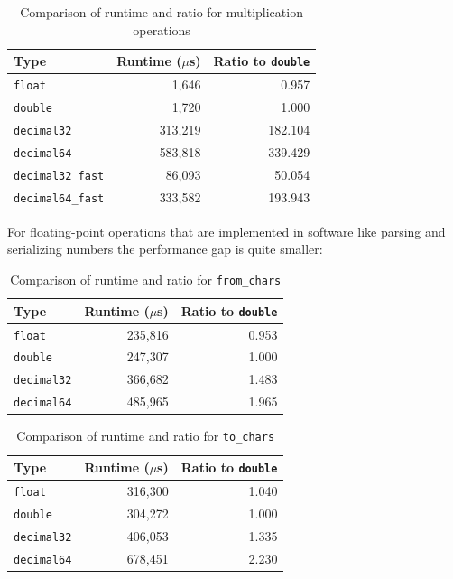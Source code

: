 \documentclass[acmsmall]{acmart}
\newcommand{\code}[1]{\texttt{#1}}
\begin{document}
\begin{table}[h]
\centering
\begin{tabular}{|l|r|r|}
\hline
Type & Runtime ($\mu$s) & Ratio to \texttt{double} \\
\hline
\texttt{float} & 1,646 & 0.957 \\
\texttt{double} & 1,720 & 1.000 \\
\texttt{decimal32} & 313,219 & 182.104 \\
\texttt{decimal64} & 583,818 & 339.429 \\
\texttt{decimal32\_fast} & 86,093 & 50.054 \\
\texttt{decimal64\_fast} & 333,582 & 193.943 \\
\hline
\end{tabular}
\caption{Comparison of runtime and ratio for multiplication operations}
\label{tab:mul-comparison}
\end{table}

For floating-point operations that are implemented in software like parsing and serializing numbers the performance gap is quite smaller:

\begin{table}[h]
\centering
\begin{tabular}{|l|r|r|}
\hline
Type & Runtime ($\mu$s) & Ratio to \texttt{double} \\
\hline
\texttt{float} & 235,816 & 0.953 \\
\texttt{double} & 247,307 & 1.000 \\
\texttt{decimal32} & 366,682 & 1.483 \\
\texttt{decimal64} & 485,965 & 1.965 \\
\hline
\end{tabular}
\caption{Comparison of runtime and ratio for \code{from\_chars}}
\label{tab:from-chars-comparison}
\end{table}

\begin{table}[h]
\centering
\begin{tabular}{|l|r|r|}
\hline
Type & Runtime ($\mu$s) & Ratio to \texttt{double} \\
\hline
\texttt{float} & 316,300 & 1.040 \\
\texttt{double} & 304,272 & 1.000 \\
\texttt{decimal32} & 406,053 & 1.335 \\
\texttt{decimal64} & 678,451 & 2.230 \\
\hline
\end{tabular}
\caption{Comparison of runtime and ratio for \code{to\_chars}}
\label{tab:runtime-comparison}
\end{table}
\end{document}
